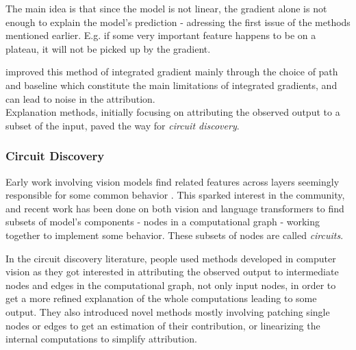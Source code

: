 \documentclass{article}
\begin{document}
The main idea is that since the model is not linear, the gradient alone is not enough to explain the model's prediction - adressing the first issue of the methods mentioned earlier. E.g. if some very important feature happens to be on a plateau, it will not be picked up by the gradient.%
    
\citet{smilkov2017smoothgradIG, miglani2020investigatingIG, kapishnikov2021guidedGIG} improved this method of integrated gradient mainly through the choice of path and baseline which constitute the main limitations of integrated gradients, and can lead to noise in the attribution.\\ %

Explanation methods, initially focusing on attributing the observed output to a subset of the input, paved the way for \emph{circuit discovery}.

\subsubsection{Circuit Discovery}
\label{sec:circuit_discovery}

Early work involving vision models find related features across layers seemingly responsible for some common behavior \citep{olah2020zoomCircuits}. This sparked interest in the community, and recent work has been done on both vision and language transformers to find subsets of model's components - nodes in a computational graph - working together to implement some behavior. These subsets of nodes are called \emph{circuits}.

In the circuit discovery literature, people used methods developed in computer vision \citep{syed2023attributionCircuits, marks2024sparseCircuits} as they got interested in attributing the observed output to intermediate nodes and edges in the computational graph, not only input nodes, in order to get a more refined explanation of the whole computations leading to some output. They also introduced novel methods \citep{wang2022interpretabilityCircuits, conmy2023automatedACDCCircuits, ferrando2024informationCircuits, he2024dictionaryCircuits} mostly involving patching single nodes or edges to get an estimation of their contribution, or linearizing the internal computations to simplify attribution.\\
\end{document}
